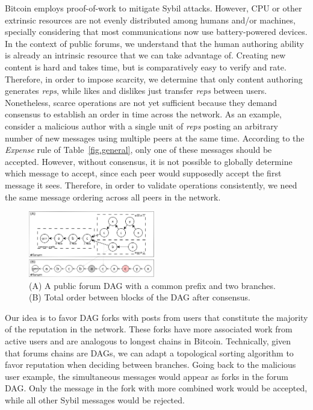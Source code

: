 \documentclass[10pt,journal,compsoc]{IEEEtran}
\newcommand{\reps}     {\emph{reps}\xspace}
\begin{document}
Bitcoin employs proof-of-work to mitigate Sybil attacks.
However, CPU or other extrinsic resources are not evenly distributed among
humans and/or machines, specially considering that most communications now use
battery-powered devices.
%
In the context of public forums, we understand that the human authoring ability
is already an intrinsic resource that we can take advantage of.
Creating new content is hard and takes time, but is comparatively easy to
verify and rate.
Therefore, in order to impose scarcity, we determine that only content
authoring generates \reps, while likes and dislikes just transfer \reps between
users.
%
Nonetheless, scarce operations are not yet sufficient because they demand
consensus to establish an order in time across the network.
As an example, consider a malicious author with a single unit of \reps posting
an arbitrary number of new messages using multiple peers at the same time.
According to the \emph{Expense} rule of Table~\ref{fig.general}, only one of
these messages should be accepted.
However, without consensus, it is not possible to globally determine which
message to accept, since each peer would supposedly accept the first message it
sees.
Therefore, in order to validate operations consistently, we need the same
message ordering across all peers in the network.

\begin{figure}
\centering
\includegraphics[width=0.49\textwidth]{reps2.png}
\caption{
    (A) A public forum DAG with a common prefix and two branches.
    (B) Total order between blocks of the DAG after consensus.
}
\label{fig.reps}
\end{figure}

Our idea is to favor DAG forks with posts from users that constitute the
majority of the reputation in the network.
These forks have more associated work from active users and are analogous to
longest chains in Bitcoin.
Technically, given that forums chains are DAGs, we can adapt a topological
sorting algorithm to favor reputation when deciding between branches.
%
Going back to the malicious user example, the simultaneous messages would
appear as forks in the forum DAG.
Only the message in the fork with more combined work would be accepted, while
all other Sybil messages would be rejected.
\end{document}
